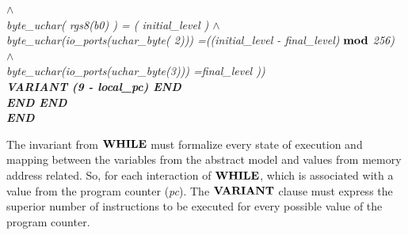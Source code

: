 \documentclass[11pt]{article} %
\begin{document}
{\begin{sloppypar}
$\land$\\
\hspace*{1.10in}\it byte\_uchar\rm ( \it rgs8\rm (\it b0\rm ) \rm ) \rm = \rm ( \it initial\_level \rm )
$\land$\\
\hspace*{1.10in}\it byte\_uchar\rm (\it io\_ports\rm (\it uchar\_byte\rm (\rm
2\rm )\rm )\rm ) \rm =\hspace*{0.10in}\rm (\rm (\it initial\_level \rm - \it
final\_level\rm )  $\mod$  \rm 2\rm 5\rm 6\rm )\\ \hspace*{1.10in} $\land$\\
\hspace*{1.10in}\it byte\_uchar\rm (\it io\_ports\rm (\it uchar\_byte\rm (\rm 3\rm )\rm )\rm ) \rm
=\hspace*{0.10in}\it final\_level \rm )\rm )\\
\hspace*{0.70in}\bf VARIANT \rm (\rm 9 \rm - \it local\_pc\rm ) \bf END\hspace*{0.50in}\\
\hspace*{0.70in}\bf END
\hspace*{0.20in}\bf END\\
\hspace*{0.40in}\bf END
\end{sloppypar}
}


% 

The invariant from $\WHILE$ must formalize every state of execution and mapping
between the variables from the abstract model and values from memory address
related. So, for each interaction of $\WHILE$, which  is associated with a
value from the program counter (\textit{pc}). The $\VARIANT$ clause must express
the superior number of instructions to be executed for every possible value of
the program counter.


\end{document}
